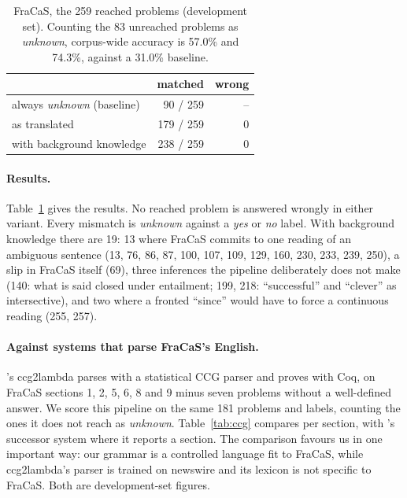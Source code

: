 \documentclass[11pt]{article}
\newcommand{\yes}{\textit{yes}}
\newcommand{\no}{\textit{no}}
\newcommand{\unk}{\textit{unknown}}
\begin{document}
\begin{table}[t]
\centering\small
\begin{tabular}{lrr}
\toprule
& matched & wrong \\
\midrule
always \unk{} (baseline) & 90 / 259 & -- \\
as translated & 179 / 259 & 0 \\
with background knowledge & 238 / 259 & 0 \\
\bottomrule
\end{tabular}
\caption{FraCaS, the 259 reached problems (development set). Counting
the 83 unreached problems as \unk{}, corpus-wide accuracy is 57.0\% and
74.3\%, against a 31.0\% baseline.}
\label{tab:fracas}
\end{table}

\paragraph{Results.} Table~\ref{tab:fracas} gives the results. No
reached problem is answered wrongly in either variant. Every mismatch is
\unk{} against a \yes{} or \no{} label. With background knowledge there
are 19: 13 where FraCaS commits to one reading of an ambiguous sentence
(13, 76, 86, 87, 100, 107, 109, 129, 160, 230, 233, 239, 250), a slip in
FraCaS itself (69), three inferences the pipeline deliberately does not
make (140: what is said closed under entailment; 199, 218: ``successful''
and ``clever'' as intersective), and two where a fronted ``since'' would
have to force a continuous reading (255, 257).

\paragraph{Against systems that parse FraCaS's English.}
\citet{mineshima-etal-2015-higher}'s ccg2lambda parses with a
statistical CCG parser and proves with Coq, on FraCaS sections 1, 2, 5,
6, 8 and 9 minus seven problems without a well-defined answer. We
score this pipeline on the same 181 problems and labels, counting the
ones it does not reach as \unk{}.
Table~\ref{tab:ccg} compares per section, with
\citet{haruta-etal-2020-logical}'s successor system where it reports a
section. The comparison favours us in one important way: our grammar is
a controlled language fit to FraCaS, while ccg2lambda's parser is
trained on newswire and its lexicon is not specific to FraCaS. Both are
development-set figures.
\end{document}
